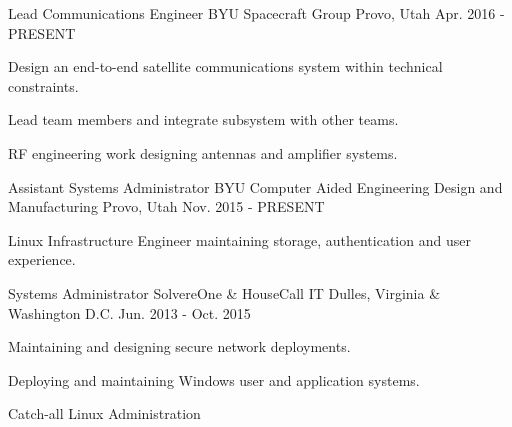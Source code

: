 

\begin{cventries}

  \cventry
  {Lead Communications Engineer} %
  {BYU Spacecraft Group} %
  {Provo, Utah} %
  {Apr. 2016 - PRESENT} %
    {
      \begin{cvitems} %
      \item {Design an end-to-end satellite communications system within technical constraints.}
      \item {Lead team members and integrate subsystem with other teams.}
      \item {RF engineering work designing antennas and amplifier systems.}
      \end{cvitems}
    }

  \cventry
  {Assistant Systems Administrator} %
  {BYU Computer Aided Engineering Design and Manufacturing} %
    {Provo, Utah} %
    {Nov. 2015 - PRESENT} %
    {
      \begin{cvitems} %
      \item {Linux Infrastructure Engineer maintaining storage, authentication and user experience.}
      \end{cvitems}
    }

  \cventry
  {Systems Administrator} %
  {SolvereOne & HouseCall IT} %
  {Dulles, Virginia & Washington D.C.} %
    {Jun. 2013 - Oct. 2015} %
    {
      \begin{cvitems} %
      \item {Maintaining and designing secure network deployments.}
      \item {Deploying and maintaining Windows user and application systems.}
      \item {Catch-all Linux Administration}
      \end{cvitems}
    }

\end{cventries}
